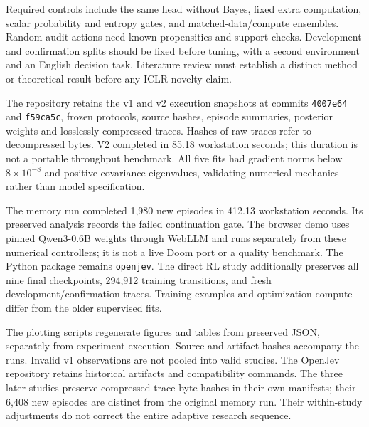 \documentclass[11pt]{article}
\begin{document}
Required controls include the same head without Bayes, fixed extra computation, scalar probability and entropy gates, and matched-data/compute ensembles. Random audit actions need known propensities and support checks. Development and confirmation splits should be fixed before tuning, with a second environment and an English decision task. Literature review must establish a distinct method or theoretical result before any ICLR novelty claim.

The repository retains the v1 and v2 execution snapshots at commits \texttt{4007e64} and \texttt{f59ca5c}, frozen protocols, source hashes, episode summaries, posterior weights and losslessly compressed traces. Hashes of raw traces refer to decompressed bytes. V2 completed in 85.18 workstation seconds; this duration is not a portable throughput benchmark. All five fits had gradient norms below $8\times10^{-8}$ and positive covariance eigenvalues, validating numerical mechanics rather than model specification.

The memory run completed 1,980 new episodes in 412.13 workstation seconds. Its preserved analysis records the failed continuation gate. The browser demo uses pinned Qwen3-0.6B weights through WebLLM and runs separately from these numerical controllers; it is not a live Doom port or a quality benchmark. The Python package remains \texttt{openjev}. The direct RL study additionally preserves all nine final checkpoints, 294,912 training transitions, and fresh development/confirmation traces. Training examples and optimization compute differ from the older supervised fits.\par

The plotting scripts regenerate figures and tables from preserved JSON, separately from experiment execution. Source and artifact hashes accompany the runs. Invalid v1 observations are not pooled into valid studies. The OpenJev repository retains historical artifacts and compatibility commands. The three later studies preserve compressed-trace byte hashes in their own manifests; their 6,408 new episodes are distinct from the original memory run. Their within-study adjustments do not correct the entire adaptive research sequence.



\end{document}
